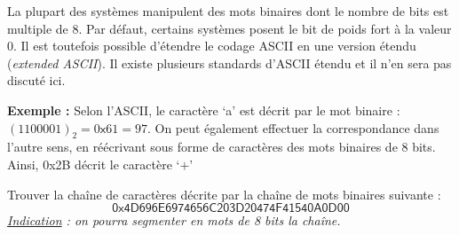 \documentclass[../../main.tex]{subfiles}
\begin{document}
La plupart des systèmes manipulent des mots binaires dont le nombre de bits est multiple de $8$. Par défaut, certains systèmes posent le bit de poids fort à la valeur 0. Il est toutefois possible d'étendre le codage ASCII en une version étendu (\textit{extended ASCII}). Il existe plusieurs standards d'ASCII étendu et il n'en sera pas discuté ici.
 
\textbf{Exemple :} Selon l'ASCII, le caractère `a' est décrit par le mot binaire : $(1100001)_{2} = 0\textsf{x}61 = 97$. On peut également effectuer la correspondance dans l'autre sens, en réécrivant sous forme de caractères des mots binaires de 8 bits. Ainsi, \textsf{0x2B} décrit le caractère `$+$'
 
Trouver la chaîne de caractères décrite par la chaîne de mots binaires suivante :
$$\textsf{0x4D696E6974656C203D20474F41540A0D00}$$
\textit{\underline{Indication} : on pourra segmenter en mots de 8 bits la chaîne.}
\end{document}
